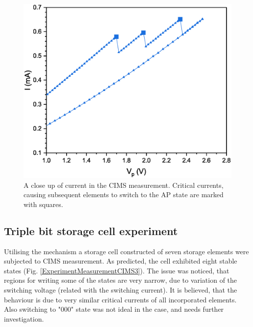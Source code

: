     \begin{figure}[H]
        \centering
        \includegraphics[width=0.7\paperwidth]{img/05/ResultsCIMS2Zoom.eps}
        \caption{A close up of current in the CIMS measurement. Critical currents, causing subsequent elements to switch to the AP state are marked with squares.}
        \label{ExperimentMeasurementCIMS2Zoom}
    \end{figure}

\subsection{Triple bit storage cell experiment} \label{sec:ExperimentMeasurementsTripple}    
    
    Utilising the mechanism a storage cell constructed of seven storage elements were subjected to CIMS measurement. As predicted, the cell exhibited eight stable states (Fig. \ref{ExperimentMeasurementCIMS3}). The issue was noticed, that regions for writing some of the states are very narrow, due to variation of the switching voltage (related with the switching current). It is believed, that the behaviour is due to very similar critical currents of all incorporated elements. Also switching to "000" state was not ideal in the case, and needs further investigation.
    
